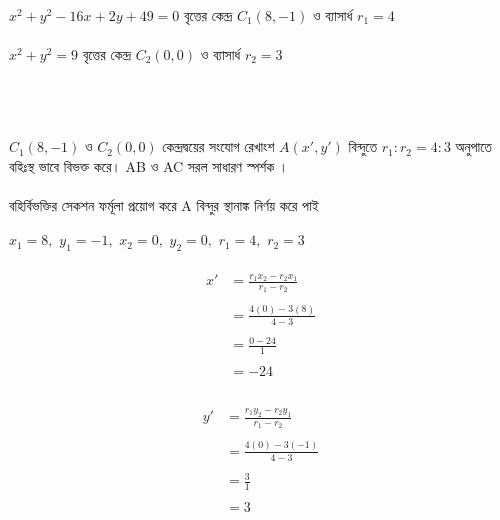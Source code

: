 \documentclass{article}
\begin{document}
\\ 
 $x^2+y^2-16x+2y+49=0$ বৃত্তের কেন্দ্র  $C_1(8,-1)$ ও ব্যাসার্ধ  $r_1=4$\\
 \\
  $x^2+y^2=9$ বৃত্তের কেন্দ্র  $C_2(0,0)$ ও ব্যাসার্ধ  $r_2=3$\\
 \\ 
 \\
 \\
 $C_1(8,-1)$ ও $C_2(0,0)$ কেন্দ্রদ্বয়ের সংযোগ রেখাংশ $A(x',y')$ বিন্দুতে  $r_1:r_2=4:3$ অনুপাতে বহিঃস্থ ভাবে বিভক্ত করে।  AB ও AC সরল সাধারণ স্পর্শক । \\ 
 \\ 
 বহির্বিভক্তির সেকশন ফর্মূলা প্রয়োগ করে A বিন্দুর স্থানাঙ্ক নির্ণয় করে পাই \\
\\ 
$x_1=8,\,\,y_1=-1,\,\,x_2=0,\,\,y_2=0,\,\,r_1=4,\,\,r_2=3$\\
\\
\begin{align*}
	x'&=\frac{r_1x_2-r_2x_1}{r_1-r_2}\\
	\\
	&=\frac{4(0)-3(8)}{4-3}\\
	\\
	&=\frac{0-24}{1}\\
	\\
	&=-24\\
\end{align*}
\\
\begin{align*}
	y'&=\frac{r_1y_2-r_2y_1}{r_1-r_2}\\
	\\
	&=\frac{4(0)-3(-1)}{4-3}\\
	\\
	&=\frac{3}{1}\\
	\\
	&=3\\
\end{align*}
\end{document}
